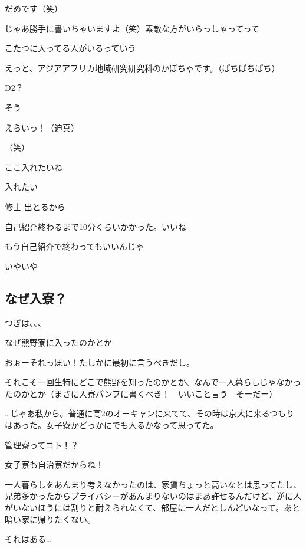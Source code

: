 \begin{multicols}{2}
  だめです（笑）

  じゃあ勝手に書いちゃいますよ（笑）素敵な方がいらっしゃってって

  こたつに入ってる人がいるっていう

  えっと、アジアアフリカ地域研究研究科のかぼちゃです。（ぱちぱちぱち）

  D2？

  そう

  えらいっ！（迫真）

  （笑）

  ここ入れたいね

  入れたい

  修士 出とるから

  自己紹介終わるまで10分くらいかかった。いいね

  もう自己紹介で終わってもいいんじゃ

  いやいや

  \subsection{なぜ入寮？}

  つぎは、、、

  なぜ熊野寮に入ったのかとか

  おぉーそれっぽい！たしかに最初に言うべきだし。

  それこそ一回生特にどこで熊野を知ったのかとか、なんで一人暮らしじゃなかったのかとか（まさに入寮パンフに書くべき！　いいこと言う　そーだー）

  …じゃあ私から。普通に高2のオーキャンに来てて、その時は京大に来るつもりはあった。女子寮かどっかにでも入るかなって思ってた。

  管理寮ってコト！？

  女子寮も自治寮だからね！

  一人暮らしをあんまり考えなかったのは、家賃ちょっと高いなとは思ってたし、兄弟多かったからプライバシーがあんまりないのはまあ許せるんだけど、逆に人がいないほうには割りと耐えられなくて、部屋に一人だとしんどいなって。あと暗い家に帰りたくない。

  それはある…


\end{multicols}
